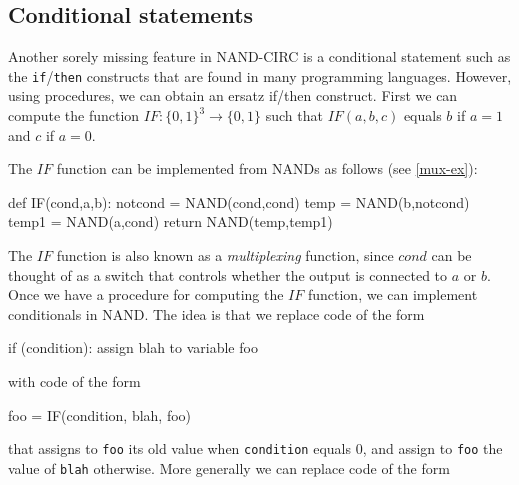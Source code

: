 \subsection{Conditional statements}\label{ifstatementsec}

Another sorely missing feature in NAND-CIRC is a conditional statement
such as the \texttt{if}/\texttt{then} constructs that are found in many
programming languages. However, using procedures, we can obtain an
ersatz if/then construct. First we can compute the function
\(\ensuremath{\mathit{IF}}:\{0,1\}^3 \rightarrow \{0,1\}\) such that
\(\ensuremath{\mathit{IF}}(a,b,c)\) equals \(b\) if \(a=1\) and \(c\) if
\(a=0\).


The \(\ensuremath{\mathit{IF}}\) function can be implemented from NANDs
as follows (see \cref{mux-ex}):

\begin{code}
def IF(cond,a,b):
    notcond = NAND(cond,cond)
    temp = NAND(b,notcond)
    temp1 = NAND(a,cond)
    return NAND(temp,temp1)
\end{code}

The \(\ensuremath{\mathit{IF}}\) function is also known as a
\emph{multiplexing} function, since \(cond\) can be thought of as a
switch that controls whether the output is connected to \(a\) or \(b\).
Once we have a procedure for computing the \(\ensuremath{\mathit{IF}}\)
function, we can implement conditionals in NAND. The idea is that we
replace code of the form

\begin{code}
if (condition):  assign blah to variable foo
\end{code}

with code of the form

\begin{code}
foo   = IF(condition, blah, foo)
\end{code}

that assigns to \texttt{foo} its old value when \texttt{condition}
equals \(0\), and assign to \texttt{foo} the value of \texttt{blah}
otherwise. More generally we can replace code of the form

